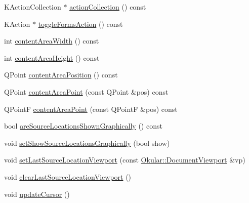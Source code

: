 \begin{DoxyCompactItemize}
K\+Action\+Collection $\ast$ \hyperlink{classPageView_a25067c9d6511ec48c69ec845f4d371f0}{action\+Collection} () const 
\item 
K\+Action $\ast$ \hyperlink{classPageView_a081dfad8c188c934c0c72d953fcca6a0}{toggle\+Forms\+Action} () const 
\item 
int \hyperlink{classPageView_acaead56a0e9efe0ad73e8c532fa9f160}{content\+Area\+Width} () const 
\item 
int \hyperlink{classPageView_a470bc494311a2741be6b84fca1bed847}{content\+Area\+Height} () const 
\item 
Q\+Point \hyperlink{classPageView_a055aaf87367b9ad0dcfcdc3d2f5ff619}{content\+Area\+Position} () const 
\item 
Q\+Point \hyperlink{classPageView_a7f432d3d6d05c69b568ad66a9c232cd7}{content\+Area\+Point} (const Q\+Point \&pos) const 
\item 
Q\+Point\+F \hyperlink{classPageView_a500fae7d053e7941ce0d02db28eac3cf}{content\+Area\+Point} (const Q\+Point\+F \&pos) const 
\item 
bool \hyperlink{classPageView_acc9042c07ce662cc9acc0ec11d50bf85}{are\+Source\+Locations\+Shown\+Graphically} () const 
\item 
void \hyperlink{classPageView_a17deaed022d1012ce0e663bcbc22e0d9}{set\+Show\+Source\+Locations\+Graphically} (bool show)
\item 
void \hyperlink{classPageView_a6564b027a53154dc576bf93b161bb440}{set\+Last\+Source\+Location\+Viewport} (const \hyperlink{classOkular_1_1DocumentViewport}{Okular\+::\+Document\+Viewport} \&vp)
\item 
void \hyperlink{classPageView_ac4df468cf5e87b8b3557bc609fd6498b}{clear\+Last\+Source\+Location\+Viewport} ()
\item 
void \hyperlink{classPageView_a0054ba6d2967fa31dea42dcc9d9020b6}{update\+Cursor} ()
\end{DoxyCompactItemize}
